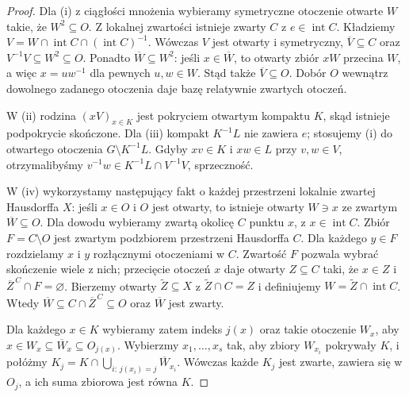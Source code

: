 \begin{proof}
Dla (i) z ciągłości mnożenia wybieramy symetryczne
otoczenie otwarte $W$ takie, że $W^2\subseteq O$.
Z lokalnej zwartości istnieje zwarty $C$ z
$e\in\operatorname{int}C$. Kładziemy
$V=W\cap\operatorname{int}C\cap(\operatorname{int}C)^{-1}$.
Wówczas $V$ jest otwarty i symetryczny,
$\overline V\subseteq C$ oraz
$V^{-1}V\subseteq W^2\subseteq O$.
Ponadto $\overline W\subseteq W^2$: jeśli $x\in\overline W$,
to otwarty zbiór $xW$ przecina $W$, a więc
$x=uw^{-1}$ dla pewnych $u,w\in W$.
Stąd także $\overline V\subseteq O$.
Dobór $O$ wewnątrz dowolnego zadanego otoczenia
daje bazę relatywnie zwartych otoczeń.

W (ii) rodzina $(xV)_{x\in K}$ jest pokryciem otwartym
kompaktu $K$, skąd istnieje podpokrycie skończone.
Dla (iii) kompakt $K^{-1}L$ nie zawiera $e$;
stosujemy (i) do otwartego otoczenia
$G\setminus K^{-1}L$. Gdyby $xv\in K$ i $xw\in L$
przy $v,w\in V$, otrzymalibyśmy
$v^{-1}w\in K^{-1}L\cap V^{-1}V$, sprzeczność.

W (iv) wykorzystamy następujący fakt o każdej przestrzeni
lokalnie zwartej Hausdorffa $X$: jeśli $x\in O$ i $O$
jest otwarty, to istnieje otwarty $W\ni x$ ze
zwartym $\overline W\subseteq O$. Dla dowodu wybieramy
zwartą okolicę $C$ punktu $x$, z $x\in\operatorname{int}C$.
Zbiór $F=C\setminus O$ jest zwartym podzbiorem
przestrzeni Hausdorffa $C$. Dla każdego $y\in F$
rozdzielamy $x$ i $y$ rozłącznymi otoczeniami w $C$.
Zwartość $F$ pozwala wybrać skończenie wiele z nich;
przecięcie otoczeń $x$ daje otwarty $Z\subseteq C$
taki, że $x\in Z$ i $\overline Z^{\,C}\cap F=\varnothing$.
Bierzemy otwarty $\widetilde Z\subseteq X$ z
$\widetilde Z\cap C=Z$ i definiujemy
$W=\widetilde Z\cap\operatorname{int}C$.
Wtedy $\overline W\subseteq C\cap\overline Z^{\,C}
\subseteq O$ oraz $\overline W$ jest zwarty.

Dla każdego $x\in K$ wybieramy zatem indeks $j(x)$
oraz takie otoczenie $W_x$, aby
$x\in W_x\subseteq\overline W_x\subseteq O_{j(x)}$.
Wybierzmy $x_1,\dots,x_s$ tak, aby zbiory $W_{x_i}$
pokrywały $K$, i połóżmy
$K_j=K\cap\bigcup_{i:\,j(x_i)=j}\overline W_{x_i}$.
Wówczas każde $K_j$ jest zwarte, zawiera się w $O_j$,
a ich suma zbiorowa jest równa $K$.
\end{proof}

